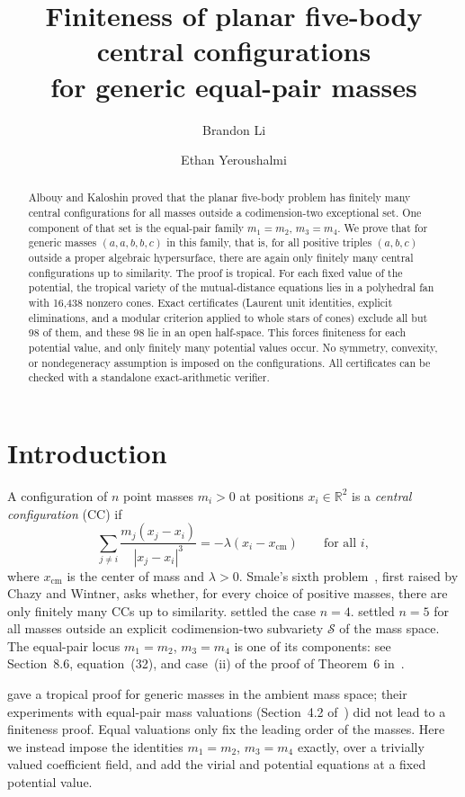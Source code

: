 \documentclass[11pt]{amsart}
\title[Finiteness for generic equal-pair masses]{Finiteness of planar five-body central configurations\\ for generic equal-pair masses}
\author{Brandon Li}
\author{Ethan Yeroushalmi}
\date{}
\theoremstyle{definition}\newtheorem{definition}[theorem]{Definition}\theoremstyle{remark}\newtheorem{remark}[theorem]{Remark}
\begin{document}
\begin{abstract}
Albouy and Kaloshin proved that the planar five-body problem has finitely many central configurations for all masses outside a codimension-two exceptional set. One component of that set is the equal-pair family $m_1=m_2$, $m_3=m_4$. We prove that for generic masses $(a,a,b,b,c)$ in this family, that is, for all positive triples $(a,b,c)$ outside a proper algebraic hypersurface, there are again only finitely many central configurations up to similarity. The proof is tropical. For each fixed value of the potential, the tropical variety of the mutual-distance equations lies in a polyhedral fan with 16,438 nonzero cones. Exact certificates (Laurent unit identities, explicit eliminations, and a modular criterion applied to whole stars of cones) exclude all but 98 of them, and these 98 lie in an open half-space. This forces finiteness for each potential value, and only finitely many potential values occur. No symmetry, convexity, or nondegeneracy assumption is imposed on the configurations. All certificates can be checked with a standalone exact-arithmetic verifier.
\end{abstract}

\maketitle
\section{Introduction}
A configuration of $n$ point masses $m_i>0$ at positions $x_i\in\mathbb{R}^2$ is a \emph{central configuration} (CC) if
\[
 \sum_{j\ne i} \frac{m_j(x_j-x_i)}{|x_j-x_i|^3}
 = -\lambda(x_i-x_{\mathrm{cm}})\qquad\text{for all }i,
\]
where $x_{\mathrm{cm}}$ is the center of mass and $\lambda>0$.
Smale's sixth problem~\citep{Smale}, first raised by Chazy and Wintner, asks whether, for every choice of positive masses, there are only finitely many CCs up to similarity.
\citet{HM} settled the case $n=4$. \citet{AK} settled $n=5$ for all masses outside an explicit
codimension-two subvariety $\mathcal{S}$ of the mass space. The equal-pair locus $m_1=m_2$, $m_3=m_4$ is one of its components: see Section~8.6, equation~(32), and case~(ii) of the proof of Theorem~6 in~\citep{AK}.


\citet{JL} gave a tropical proof for generic masses in the ambient mass space; their experiments with equal-pair mass valuations (Section~4.2 of~\citep{JL}) did not lead to a finiteness proof. Equal valuations only fix the leading order of the masses. Here we instead impose the identities $m_1=m_2$, $m_3=m_4$ exactly, over a trivially valued coefficient field, and add the virial and potential equations at a fixed potential value.
\end{document}
